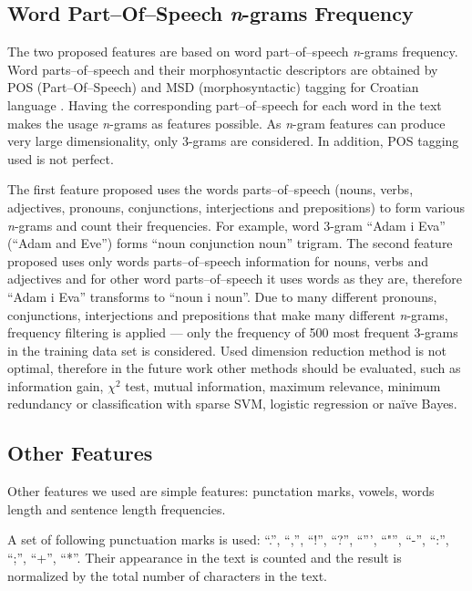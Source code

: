 \documentclass{llncs}
\begin{document}
\subsection{Word Part--Of--Speech \emph{n}-grams Frequency}
\label{sec:ngrami-tipova}
The two proposed features are based on word part--of--speech \emph{n}-grams
frequency. Word parts--of--speech and their morphosyntactic descriptors are obtained by POS
(Part--Of--Speech) and MSD (morphosyntactic) tagging for Croatian language
\cite{snajder08automatic}. Having the corresponding part--of--speech for
each word in the text makes the usage \emph{n}-grams as features
possible. As \emph{n}-gram features can produce very large dimensionality, 
only 3-grams are considered. In addition, POS tagging used is not perfect.

The first feature proposed uses the words parts--of--speech
(nouns, verbs, adjectives, pronouns, conjunctions, interjections and
prepositions) to form various \emph{n}-grams and count their frequencies. For
example, word 3-gram ``Adam i Eva'' (``Adam and Eve'') forms ``noun
conjunction noun'' trigram. The second feature proposed uses only words
parts--of--speech information for nouns, verbs and adjectives and for other word
parts--of--speech it uses words as they are, therefore ``Adam i Eva'' transforms
to ``noun i noun''. Due to many different pronouns, conjunctions, interjections
and prepositions that make many different \emph{n}-grams, frequency filtering
is applied --- only the frequency of 500 most frequent 3-grams in the
training data set is considered. Used dimension reduction method is not optimal,
therefore in the future work other methods should be evaluated, such as information
gain, $\chi^2$ test, mutual information, maximum relevance, minimum redundancy
or classification with sparse SVM, logistic regression or na\"ive Bayes.

\subsection{Other Features}
\label{sec:znacajke-manje}

Other features we used are simple features: punctation marks, vowels, words
length and sentence length frequencies.

A set of following punctuation marks is used: ``.'', ``,'', ``!'', ``?'',
``''', ``"'', ``-'', ``:'', ``;'', ``+'', ``*''. Their appearance in the text is counted and
the result is normalized by the total number of characters in the text. 
\end{document}

